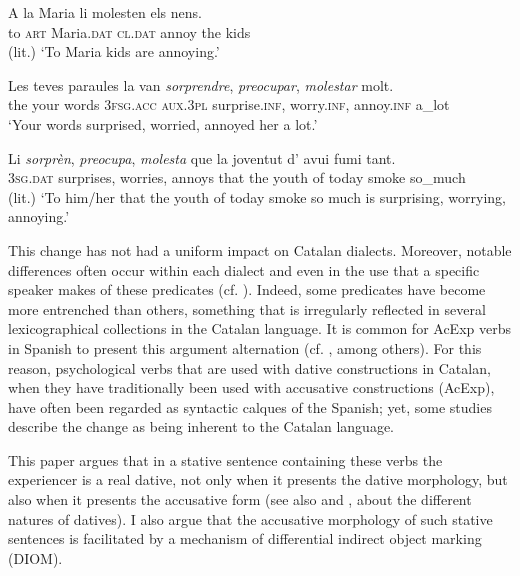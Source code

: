 \documentclass[output=paper,colorlinks,citecolor=brown,modfonts,nonflat]{langsci/langscibook}
\begin{document}
 \ex \label{ex:royo:1b}
 \gll A la Maria li molesten els nens.\\
 to \textsc{art} Maria.\textsc{dat} \textsc{cl.dat} annoy the kids\\
 \glt  (lit.) ‘To Maria kids are annoying.’
 \z
 \z
 
\ea%
 \label{ex:royo:2} \citealt[77]{CabréMateu1998}
 \ea \label{ex:royo:2a}
 \gll Les teves paraules la van \emph{sorprendre}, \emph{preocupar}, \emph{molestar} molt.\\
the  your words     \textsc{3fsg.acc} \textsc{aux.3pl} surprise.\textsc{inf}, worry.\textsc{inf},  annoy.\textsc{inf} a\_lot\\
 \glt ‘Your words surprised, worried, annoyed her a lot.’ 
 
 \ex \label{ex:royo:2b}
 \gll Li \emph{sorprèn}, \emph{preocupa}, \emph{molesta} que la joventut d’ avui fumi tant.\\
\textsc{3sg.dat} surprises, worries,     annoys  that the youth     of today smoke so\_much\\
 \glt	(lit.) ‘To him/her that the youth of today smoke so much is surprising, worrying, annoying.’
 
 \z
 \z
 

This change has not had a uniform impact on Catalan dialects. Moreover, notable differences often occur within each dialect and even in the use that a specific speaker makes of these predicates (cf. \citealt[70]{CabréMateu1998}). Indeed, some predicates have become more entrenched than others, something that is irregularly reflected in several lexicographical collections in the Catalan language. It is common for AcExp verbs in Spanish to present this argument alternation (cf. \citealt{MendivilGiro2005, MarínMcNally2011}, among others). For this reason, psychological verbs that are used with dative constructions in Catalan, when they have traditionally been used with accusative constructions (AcExp), have often been regarded as syntactic calques of the Spanish; yet, some studies describe the change as being inherent to the Catalan language.

This paper argues that in a stative sentence containing these verbs the experiencer is a real dative, not only when it presents the dative morphology, but also when it presents the accusative form (see also  and , about the different natures of datives). I also argue that the accusative morphology of such stative sentences is facilitated by a mechanism of differential indirect object marking (DIOM).
\end{document}
